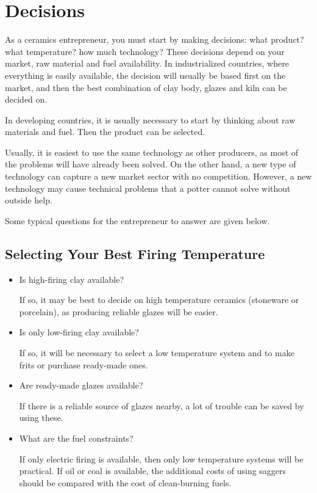\chapter{Decisions}
As a ceramics entrepreneur, you must start by making decisions: what product? 
what temperature? how much technology? These decisions depend on your market, 
raw material and fuel availability. In industrialized countries, where 
everything is easily available, the decision will usually be based first on the 
market, and then the best combination of clay body, glazes and kiln can be 
decided on.

In developing countries, it is usually necessary to start by thinking about raw 
materials and fuel. Then the product can be selected.

Usually, it is easiest to use the same technology as other producers, as most 
of the problems will have already been solved. On the other hand, a new type of 
technology can capture a new market sector with no competition. However, a new 
technology may cause technical problems that a potter cannot solve without 
outside help.

Some typical questions for the entrepreneur to answer are given below.
\section{Selecting Your Best Firing Temperature}
\begin{itemize}
\item Is high-firing clay available?

If so, it may be best to decide on high temperature ceramics (stoneware or 
porcelain), as producing reliable glazes will be easier.

\item Is only low-firing clay available?

If so, it will be necessary to select a low temperature system and to make 
frits or purchase ready-made ones.

\item Are ready-made glazes available?

If there is a reliable source of glazes nearby, a lot of trouble can be saved 
by using these.

\item What are the fuel constraints?

If only electric firing is available, then only low temperature systems will be 
practical. If oil or coal is available, the additional costs of using saggers 
should be compared with the cost of clean-burning fuels.
\end{itemize}
